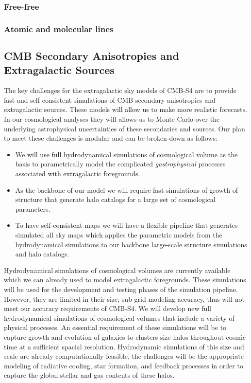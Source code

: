 \subsubsection{Free-free}

\subsubsection{Atomic and molecular lines}

\subsection{CMB Secondary Anisotropies and Extragalactic Sources}

The key challenges for the extragalactic sky models of CMB-S4 are to provide fast and self-consistent simulations of CMB secondary anisotropies and extragalactic sources. These models will allow us to make more realistic forecasts. In our cosmological analyses they will allows us to Monte Carlo over the underlying astrophysical uncertainties of these secondaries and sources. Our plan to meet these challenges is modular and can be broken down as follows: 

\begin{itemize}
\item We will use full hydrodynamical simulations of cosmological volume as the basis to parametrically model the complicated {\it gastrophysical} processes associated with extragalactic foregrounds.
\item As the backbone of our model we will require fast simulations of growth of structure that generate halo catalogs for a large set of cosmological parameters.
\item To have self-consistent maps we will have a flexible pipeline that generates simulated all sky maps which applies the parametric models from the hydrodynamical simulations to our backbone large-scale structure simulations and halo catalogs.
\end{itemize}

Hydrodynamical simulations of cosmological volumes are currently available which we can already used to model extragalactic foregrounds. These simulations will be used for the development and testing phases of the simulation pipeline. However, they are limited in their size, sub-grid modeling accuracy, thus will not meet our accuracy requirements of CMB-S4. We will develop new full hydrodynamical simulations of cosmological volumes that include a variety of physical processes. An essential requirement of these simulations will be to capture growth and evolution of galaxies to clusters size halos throughout cosmic time at a sufficient spacial resolution. Hydrodynamic simulations of this size and scale are already computationally feasible, the challenges will be the appropriate modeling of radiative cooling, star formation, and feedback processes in order to capture the global stellar and gas contents of these halos.


